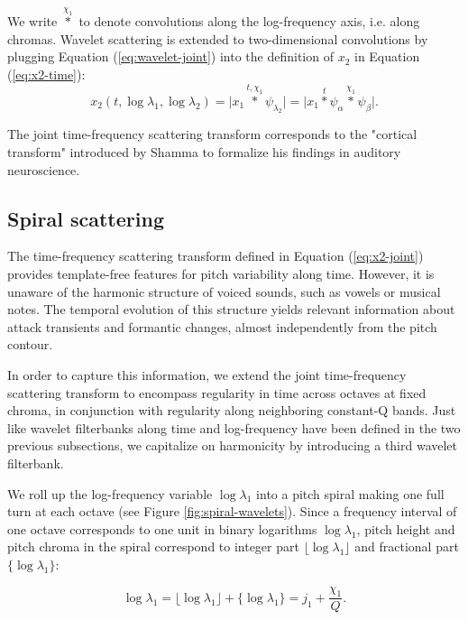 \documentclass[twoside,a4paper]{article}
\begin{document}
We write $\overset{\chi_{1}}{\ast}$ to denote convolutions along the log-frequency axis, i.e. along chromas.  Wavelet scattering is extended to two-dimensional convolutions by plugging Equation (\ref{eq:wavelet-joint}) into the definition of $x_2$ in Equation (\ref{eq:x2-time}):
\begin{equation}
x_{2}(t,\log \lambda_{1},\log \lambda_{2}) =
\vert x_{1} \overset{t, \chi_{1}}{\ast} \psi_{\lambda_{2}} \vert =
\vert x_{1} \overset{t}{\ast} \psi_{\alpha} \overset{\chi_{1}}{\ast} \psi_{\beta} \vert.
\label{eq:x2-joint}
\end{equation}

The joint time-frequency scattering transform corresponds to the "cortical transform" introduced by Shamma to formalize his findings in auditory neuroscience.



\subsection{Spiral scattering}

The time-frequency scattering transform defined in Equation (\ref{eq:x2-joint}) provides template-free features for pitch variability along time. However, it is unaware of the harmonic structure of voiced sounds, such as vowels or musical notes. The temporal evolution of this structure yields relevant information about attack transients and formantic changes, almost independently from the pitch contour.

In order to capture this information, we extend the joint time-frequency scattering transform to encompass regularity in time across octaves at fixed chroma, in conjunction with regularity along neighboring constant-Q bands. Just like wavelet filterbanks along time and log-frequency have been defined in the two previous subsections, we capitalize on harmonicity by introducing a third wavelet filterbank.

We roll up the log-frequency variable $\log \lambda_1$ into a pitch spiral making one full turn at each octave (see Figure \ref{fig:spiral-wavelets}). Since a frequency interval of one octave corresponds to one unit in binary logarithms $\log \lambda_1$, pitch height and pitch chroma in the spiral correspond to integer part $\lfloor \log \lambda_1 \rfloor$ and fractional part $\{ \log \lambda_1 \}$:

\begin{equation}
\log \lambda_1 = \lfloor \log \lambda_1 \rfloor + \{ \log \lambda_1 \} = j_1 + \frac{\chi_1}{Q}.
\label{eq:integer-part and fractional part}
\end{equation}
\end{document}
